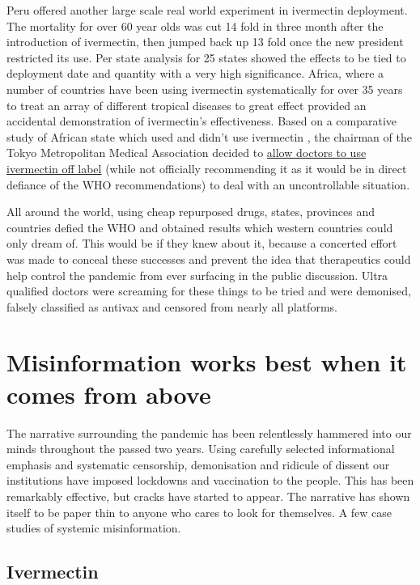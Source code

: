 \documentclass[11pt,a4paper]{article}
\begin{document}
Peru offered another large scale real world experiment in ivermectin deployment. The mortality for over 60 year olds was cut 14 fold in three month after the introduction of ivermectin, then jumped back up 13 fold once the new president restricted its use. Per state analysis for 25 states showed the effects to be tied to deployment date and quantity with a very high significance. Africa, where a number of countries have been using ivermectin systematically for over 35 years to treat an array of different tropical diseases to great effect provided an accidental demonstration of ivermectin’s effectiveness. Based on a comparative study of African state which used and didn’t use ivermectin \cite{Tanioka2021.03.26.21254377}, the chairman of the Tokyo Metropolitan Medical Association decided to \href{https://www.tokyo-np.co.jp/article/123988}{allow doctors to use ivermectin off label} (while not officially recommending it as it would be in direct defiance of the WHO recommendations) to deal with an uncontrollable situation.

All around the world, using cheap repurposed drugs, states, provinces and countries defied the WHO and obtained results which western countries could only dream of. This would be if they knew about it, because a concerted effort was made to conceal these successes and prevent the idea that therapeutics could help control the pandemic from ever surfacing in the public discussion. Ultra qualified doctors were screaming for these things to be tried and were demonised, falsely classified as antivax and censored from nearly all platforms. 

\section*{Misinformation works best when it comes from above}

The narrative surrounding the pandemic has been relentlessly hammered into our minds throughout the passed two years. Using carefully selected informational emphasis and systematic censorship, demonisation and ridicule of dissent our institutions have imposed lockdowns and vaccination to the people. This has been remarkably effective, but cracks have started to appear. The narrative has shown itself to be paper thin to anyone who cares to look for themselves. A few case studies of systemic misinformation.

\subsection*{Ivermectin}
\end{document}
